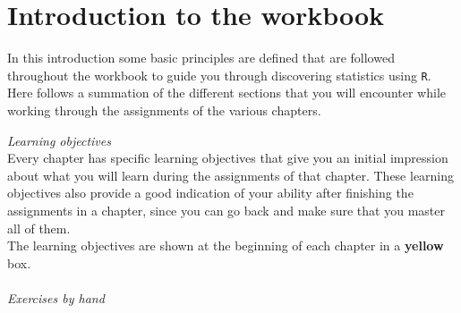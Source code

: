 \thispagestyle{emptyhead}

\section{Introduction to the workbook}

In this introduction some basic principles are defined that are followed throughout the workbook to guide you through discovering statistics using \texttt{R}. Here follows a summation of the different sections that you will encounter while working through the assignments of the various chapters. \\

\bigskip

\textit{Learning objectives} \\

Every chapter has specific learning objectives that give you an initial impression about what you will learn during the assignments of that chapter. These learning objectives also provide a good indication of your ability after finishing the assignments in a chapter, since you can go back and make sure that you master all of them. \\

The learning objectives are shown at the beginning of each chapter in a {\color{learningobjectives} \selectfont \textbf{yellow}} box. \\

\emptylearningobjectives \\

\textit{Exercises by hand} \\

